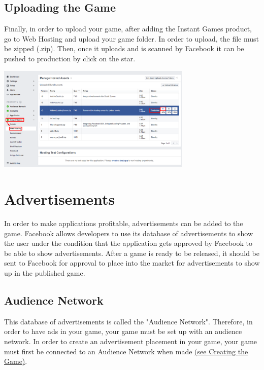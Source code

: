 \documentclass{article}
\begin{document}
\subsection{Uploading the Game}
Finally, in order to upload your game, after adding the Instant Games product, go to Web Hosting and upload your game folder. In order to upload, the file must be zipped (.zip). Then, once it uploads and is scanned by Facebook it can be pushed to production by click on the star.

\begin{center}
\includegraphics[width = 350px]{images/HostingScreen.png}
\end{center}

\section{Advertisements}
In order to make applications profitable, advertisements can be added to the game. Facebook allows developers to use its database of advertisements to show the user under the condition that the application gets approved by Facebook to be able to show advertisements. After a game is ready to be released, it should be sent to Facebook for approval to place into the market for advertisements to show up in the published game. 

\subsection{Audience Network}
This database of advertisements is called the "Audience Network". Therefore, in order to have ads in your game, your game must be set up with an audience network. In order to create an advertisement placement in your game, your game must first be connected to an Audience Network when made \hyperlink{creatinggame}{(see Creating the Game)}.
\end{document}
